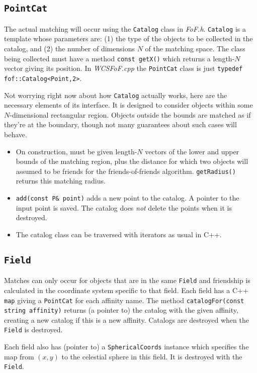 \documentclass[11pt,preprint,flushrt]{aastex}
\begin{document}
\subsection{{\tt PointCat}}
The actual matching will occur using the {\tt Catalog} class in {\it FoF.h}.  {\tt Catalog} is a template whose parameters are: (1) the type of the objects to be collected in the catalog, and (2) the number of dimensions $N$ of the matching space. The class being collected must have a method {\tt const getX()} which returns a length-$N$ vector giving its position.  In {\it WCSFoF.cpp} the {\tt PointCat} class is just {\tt typedef fof::Catalog<Point,2>}.

 Not worrying right now about how {\tt Catalog} actually works, here are the necessary elements of its interface.  It is designed to consider objects within some $N$-dimensional rectangular region.  Objects outside the bounds are matched as if they're at the boundary, though not many guarantees about such cases will behave. 
\begin{itemize}
\item On construction, must be given length-$N$ vectors of the lower and upper bounds of the matching region, plus the distance for which two objects will assumed to be friends for the friends-of-friends algorithm. {\tt getRadius()} returns this matching radius.
\item {\tt add(const P\& point)} adds a new point to the catalog.  A pointer to the input point is saved.  The catalog does {\em not} delete the points when it is destroyed.
\item The catalog class can be traversed with iterators as usual in C++.
\end{itemize}

\subsection{\tt Field}
Matches can only occur for objects that are in the same {\tt Field} and friendship is calculated in the coordinate system specific to that field.  Each field has a C++ {\tt map} giving a {\tt PointCat} for each affinity name.  The method {\tt catalogFor(const string affinity)} returns (a pointer to) the catalog with the given affinity, creating a new catalog if this is a new affinity.  Catalogs are destroyed when the {\tt Field} is destroyed.

Each field also has (pointer to) a {\tt SphericalCoords} instance which specifies the map from $(x,y)$ to the celestial sphere in this field.  It is destroyed with the {\tt Field}.
\end{document}
